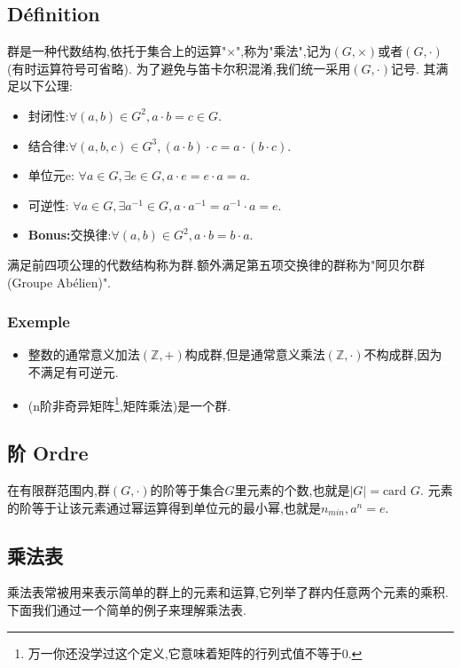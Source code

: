 \documentclass[12pt, a4paper, oneside]{ctexbook}
\begin{document}
  \subsection{Définition}
  群是一种代数结构,依托于集合上的运算"$\times$",称为"乘法",记为$(G,\times)$或者$(G,\cdot)$(有时运算符号可省略).
  为了避免与笛卡尔积混淆,我们统一采用$(G,\cdot)$记号.
  其满足以下公理:
  \begin{itemize}
    \item 封闭性:$\forall(a,b)\in G^2,a\cdot b=c\in G $.
    \item 结合律:$\forall(a,b,c)\in G^3,(a\cdot b)\cdot c=a\cdot (b\cdot c) $.
    \item 单位元e: $\forall a\in G, \exists e\in G, a\cdot e=e\cdot a=a$.
    \item 可逆性:  $\forall a\in G, \exists a^{-1}\in G, a\cdot a^{-1}=a^{-1}\cdot a=e$.
    \item \textbf{Bonus:}交换律:$\forall(a,b)\in G^2,a\cdot b=b\cdot a $.
  \end{itemize}
  满足前四项公理的代数结构称为群.额外满足第五项交换律的群称为"阿贝尔群(Groupe Abélien)".
  \subsubsection{Exemple}
  \begin{itemize}
    \item 整数的通常意义加法$(\mathbb{Z},+) $构成群,但是通常意义乘法$(\mathbb{Z},\cdot) $不构成群,因为不满足有可逆元.
    \item (n阶非奇异矩阵\footnote{万一你还没学过这个定义,它意味着矩阵的行列式值不等于0.},矩阵乘法)是一个群.



  \end{itemize}
  \subsection{阶 Ordre}
  在有限群范围内,群$(G,\cdot)$的阶等于集合$G$里元素的个数,也就是$|G|=\text{card }G$.
  元素的阶等于让该元素通过幂运算得到单位元的最小幂,也就是$n_{min},a^n=e$.

  \subsection{乘法表}
  乘法表常被用来表示简单的群上的元素和运算,它列举了群内任意两个元素的乘积.下面我们通过一个简单的例子来理解乘法表.
\end{document}
